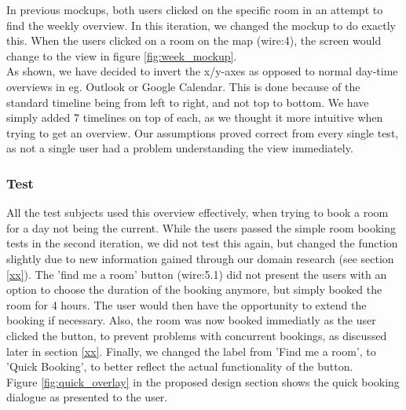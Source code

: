 In previous mockups, both users clicked on the specific room in an attempt to find the weekly overview.
In this iteration, we changed the mockup to do exactly this. When the users clicked on a room on the map (wire:4), the screen would change to the view in figure \ref{fig:week_mockup}.\\

As shown, we have decided to invert the x/y-axes as opposed to normal day-time overviews in eg. Outlook or Google Calendar. This is done because of the standard timeline being from left to right, and not top to bottom. We have simply added 7 timelines on top of each, as we thought it more intuitive when trying to get an overview. Our assumptions proved correct from every single test, as not a single user had a problem understanding the view immediately.\\

\subsubsection{Test}
All the test subjects used this overview effectively, when trying to book a room for a day not being the current. While the users passed the simple room booking tests in the second iteration, we did not test this again, but changed the function slightly due to new information gained through our domain research (see section \ref{xx}). The 'find me a room' button (wire:5.1) did not present the users with an option to choose the duration of the booking anymore, but simply booked the room for 4 hours. The user would then have the opportunity to extend the booking if necessary. Also, the room was now booked immediatly as the user clicked the button, to prevent problems with concurrent bookings, as discussed later in section \ref{xx}. Finally, we changed the label from 'Find me a room', to 'Quick Booking', to better reflect the actual functionality of the button.\\
Figure \ref{fig:quick_overlay} in the proposed design section shows the quick booking dialogue as presented to the user.


\pagebreak
